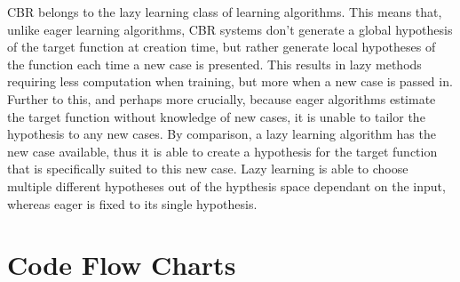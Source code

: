 \documentclass[11pt]{article}
\begin{document}
CBR belongs to the lazy learning class of learning algorithms. This means that, unlike eager
learning algorithms, CBR systems don't generate a global hypothesis of the target function at
creation time, but rather generate local hypotheses of the function each time a new case is
presented. This results in lazy methods requiring less computation when training, but more
when a new case is passed in. Further to this, and perhaps more crucially, because eager
algorithms estimate the target function without knowledge of new cases, it is unable to tailor
the hypothesis to any new cases. By comparison, a lazy learning algorithm has the new case
available, thus it is able to create a hypothesis for the target function that is specifically
suited to this new case. Lazy learning is able to choose multiple different hypotheses out of
the hypthesis space dependant on the input, whereas eager is fixed to its single hypothesis.


\section{Code Flow Charts}
\end{document}
